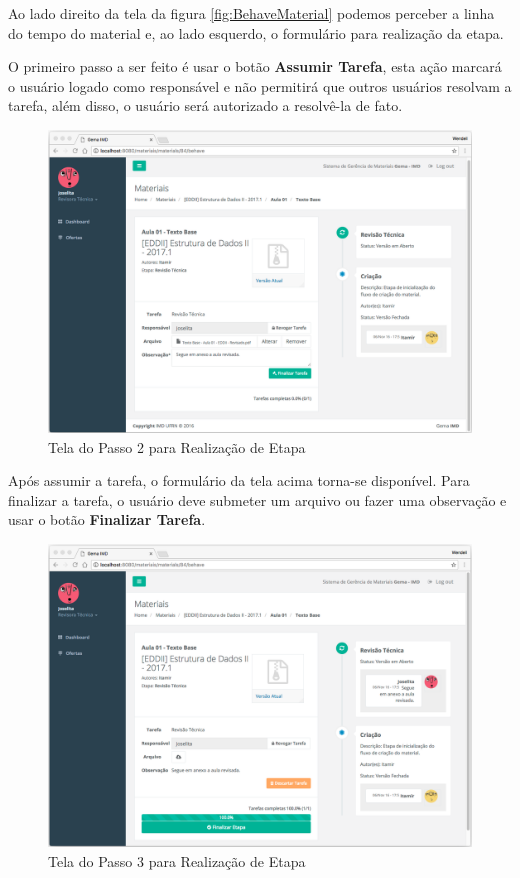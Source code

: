 Ao lado direito da tela da figura \hyperref[fig:BehaveMaterial]{\ref{fig:BehaveMaterial}} podemos perceber a linha do tempo do material e, ao lado esquerdo, o formulário para realização da etapa.

O primeiro passo a ser feito é usar o botão \textbf{Assumir Tarefa}, esta ação marcará o usuário logado como responsável e não permitirá que outros usuários resolvam a tarefa, além disso, o usuário será autorizado a resolvê-la de fato. 

\begin{figure}[H]
\centering
     \includegraphics[width=1.0\textwidth]{Screens/BehaveMaterial2.png}
      \caption{Tela do Passo 2 para Realização de Etapa}
       \label{fig:BehaveMaterial2}
\end{figure}

Após assumir a tarefa, o formulário da tela acima torna-se disponível. Para finalizar a tarefa, o usuário deve submeter um arquivo ou fazer uma observação e usar o botão \textbf{Finalizar Tarefa}.

\begin{figure}[H]
\centering
     \includegraphics[width=1.0\textwidth]{Screens/BehaveMaterial3.png}
      \caption{Tela do Passo 3 para Realização de Etapa}
       \label{fig:BehaveMaterial3}
\end{figure}

